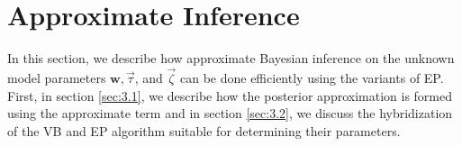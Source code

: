 \documentclass[]{article}
\begin{document}
\section{Approximate Inference}
In this section, we describe how approximate Bayesian inference on the unknown model parameters $\mathbf{w},\vec{\tau}$, and $\vec{\zeta}$ can be done efficiently using the variants of EP. First, in section \ref{sec:3.1}, we describe how the posterior approximation is formed using the approximate term and in section \ref{sec:3.2}, we discuss the hybridization of the VB and EP algorithm suitable for determining their parameters.
\end{document}
